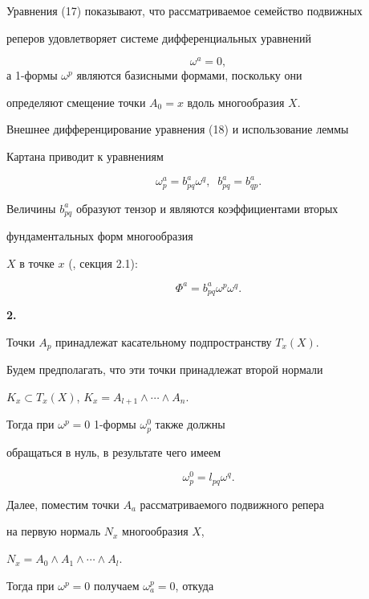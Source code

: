 Уравнения (17) показывают, что рассматриваемое семейство подвижных


реперов удовлетворяет системе дифференциальных уравнений


\begin{equation}\label{eq:26}
\omega^a = 0,


\end{equation}
а 1-формы $\omega^p$ являются базисными формами, поскольку они


определяют смещение точки $A_0 = x$ вдоль многообразия $X$.


 Внешнее дифференцирование уравнения (18) и использование леммы


Картана приводит к уравнениям


\begin{equation}\label{eq:27}
\omega_p^a = b_{pq}^a \omega^q, \;\; b_{pq}^a = b_{qp}^a.


\end{equation}


 Величины $b^a_{pq}$ образуют тензор и являются коэффициентами вторых


фундаментальных форм многообразия


$X$ в точке $x$ (\cite{AG04}, секция 2.1):


$$


\Phi^a = b_{pq}^a \omega^p \omega^q.


$$

{\bf 2.}


Точки $A_p$ принадлежат касательному подпространству $T_x(X)$.


Будем предполагать, что эти точки принадлежат второй нормали


$K_x\subset T_x (X)$, $K_x = A_{l+1} \wedge \dotsb \wedge A_n$.


Тогда при $\omega^p = 0$ 1-формы $\omega_p^0$ также должны


обращаться в нуль, в результате чего имеем


\begin{equation}\label{eq:29}
\omega_p^0 = l_{pq} \omega^q.
\end{equation}



Далее, поместим точки $A_a$ рассматриваемого подвижного репера


на первую нормаль $N_x$ многообразия $X$,


$N_x = A_0 \wedge A_{1} \wedge \dotsb \wedge A_l$.


Тогда при $\omega^p = 0$ получаем $\omega_a^p = 0$, откуда


